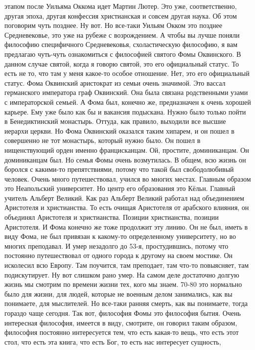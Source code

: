 этапом после Уильяма Оккома идет Мартин Лютер. Это уже, соответственно, другая
эпоха, другая конфессия христианская и совсем другая наука. Об этом поговорим
чуть позднее. Ну вот. Но все-таки Уильям Окком это позднее Средневековье, это
уже на рубеже с возрождением. А чтобы вы лучше поняли философию специфичного
Средневековья, схоластическую философию, я вам предлагаю чуть-чуть ознакомиться
с философией святого Фомы Оквинского. В данном случае святой, когда я говорю
святой, это его официальный статус. То есть не то, что там у меня какое-то
особое отношение. Нет, это его официальный статус. Фома Оквинский аристократ из
семьи очень значимой. Это вассал германского императора граф Оквинский. Она была
связана родственными узами с императорской семьей. А Фома был, конечно же,
предназначен к очень хорошей карьере. Ему уже было как бы и вакансия подыскана.
Нужно было только пойти в Бенедиктинский монастырь. Оттуда, как правило,
выходили все высшие иерархи церкви. Но Фома Оквинский оказался таким хипарем, и
он пошел в совершенно не тот монастырь, который нужно было. Он пошел в
нищенствующий орден именно францисканцам. Ой, простите, доминиканцам. Он
доминиканцам был. Но семья Фомы очень возмутилась. В общем, всю жизнь он боролся
с какими-то препятствиями, потому что такой был свободолюбивый человек. Очень
много путешествовал, учился во многих местах. Главным образом это Неапольский
университет. Но центр его образования это Кёльн. Главный учитель Альберт
Великий. Как раз Альберт Великий работал над объединением Аристотеля и
христианства. То есть очищая Аристотеля от арабского влияния, он объединял
Аристотеля и христианства. Позиции христианства, позиции Аристотеля. И Фома
конечно же тоже продолжит эту линию. Он не был, иметь в виду Фома, не был
привязан к какому-то определенному университету, но во многих преподавал. И умер
незадолго до 53-я, простудившись, потому что постоянно путешествовал от одного
города к другому на своем мостике. Он исколесил всю Европу. Там поучится, там
преподает, там что-то повыясняет, там подискутирует. Ну вот слишком рано умер.
На самом деле достаточно долгую жизнь мы смотрим по времени жизни тех, кого мы
знаем. 70-80 это нормально было для жизни, для людей, которые не военным делом
занимались, как вы понимаете, для мыслителей. Но все-таки ранняя смерть, как вы
понимаете, тогда гораздо чаще сегодня. Так вот, философия Фомы это философия
бытия. Очень интересная философия, имеется в виду, смотрите, он говорил таким
образом, философия постоянно интересуется тем, что есть какая-то вещь, что есть
этот стол, что есть эта книга, что есть Бог, то есть нас интересует сущность,
